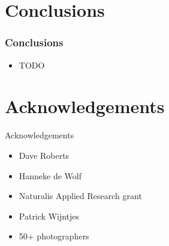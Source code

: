 \documentclass[]{beamer}
\begin{document}
\section{Conclusions}

    \begin{frame}
        \frametitle{Conclusions}

        \begin{itemize}
            \item {TODO}
        \end{itemize}
    \end{frame}


\section*{Acknowledgements}

    \begin{frame}{Acknowledgements}

        \begin{itemize}
            \item Dave Roberts
            \item Hanneke de Wolf
            \item Naturalis Applied Research grant
            \item Patrick Wijntjes
            \item 50+ photographers
        \end{itemize}
    \end{frame}
\end{document}

